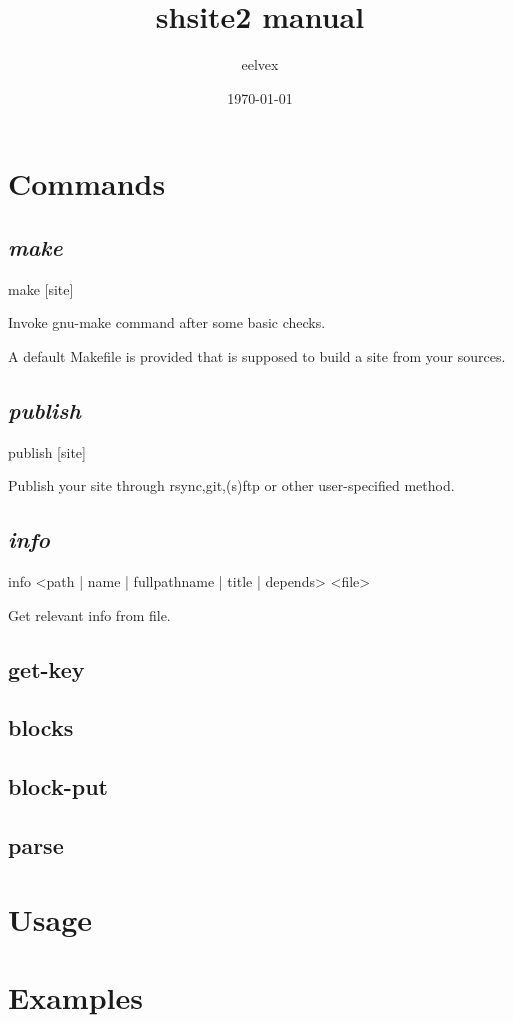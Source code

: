\documentclass{memoir}
\title{shsite2 manual}
\author{eelvex}
\date{\today}
\begin{document}
\begin{titlingpage}
\maketitle
\end{titlingpage}
\tableofcontents

\chapter{Commands} %

\section{\emph{make}}
make [site]

Invoke gnu-make command after some basic checks.

A default Makefile is provided that is supposed to build a site from your sources.
\section{\emph{publish}}
publish [site]

Publish your site through rsync,git,(s)ftp or other user-specified method.
\section{\emph{info}}
info <path | name | fullpathname | title | depends> <file>

Get relevant info from file.
\section{get-key}
\section{blocks}
\section{block-put}
\section{parse}


\chapter{Usage}
\chapter{Examples}
\end{document}
